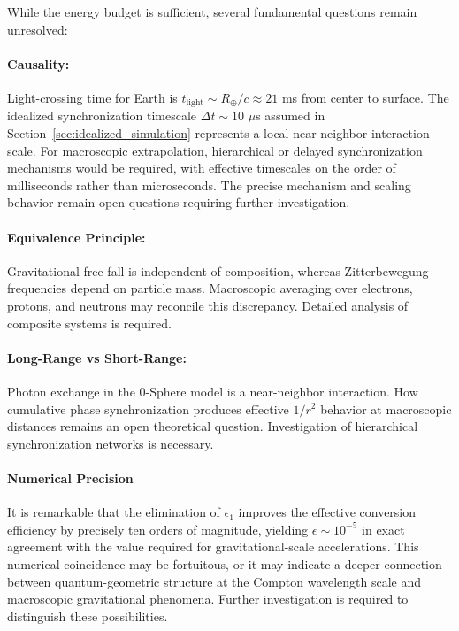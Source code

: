 \documentclass[
 reprint,
 amsmath,amssymb,
 aps,
 prb,
]{revtex4-2}
\numberwithin{equation}{section}
\begin{document}
While the energy budget is sufficient, several fundamental questions remain unresolved:

\vspace{0.5cm}

\paragraph{Causality:}
Light-crossing time for Earth is $t_{\text{light}} \sim R_{\oplus}/c \approx 21$ ms from center to surface. The idealized synchronization timescale $\Delta t \sim 10$ $\mu$s assumed in Section~\ref{sec:idealized_simulation} represents a local near-neighbor interaction scale. For macroscopic extrapolation, hierarchical or delayed synchronization mechanisms would be required, with effective timescales on the order of milliseconds rather than microseconds. The precise mechanism and scaling behavior remain open questions requiring further investigation.

\vspace{0.5cm}

\paragraph{Equivalence Principle:}
Gravitational free fall is independent of composition, whereas Zitterbewegung frequencies depend on particle mass. Macroscopic averaging over electrons, protons, and neutrons may reconcile this discrepancy. Detailed analysis of composite systems is required.

\vspace{0.5cm}

\paragraph{Long-Range vs Short-Range:}
Photon exchange in the 0-Sphere model is a near-neighbor interaction. How cumulative phase synchronization produces effective $1/r^2$ behavior at macroscopic distances remains an open theoretical question. Investigation of hierarchical synchronization networks is necessary.

\vspace{0.5cm}

\paragraph{Numerical Precision}

It is remarkable that the elimination of $\epsilon_1$ improves the effective conversion efficiency by precisely ten orders of magnitude, yielding $\epsilon \sim 10^{-5}$ in exact agreement with the value required for gravitational-scale accelerations. This numerical coincidence may be fortuitous, or it may indicate a deeper connection between quantum-geometric structure at the Compton wavelength scale and macroscopic gravitational phenomena. Further investigation is required to distinguish these possibilities.
\end{document}
